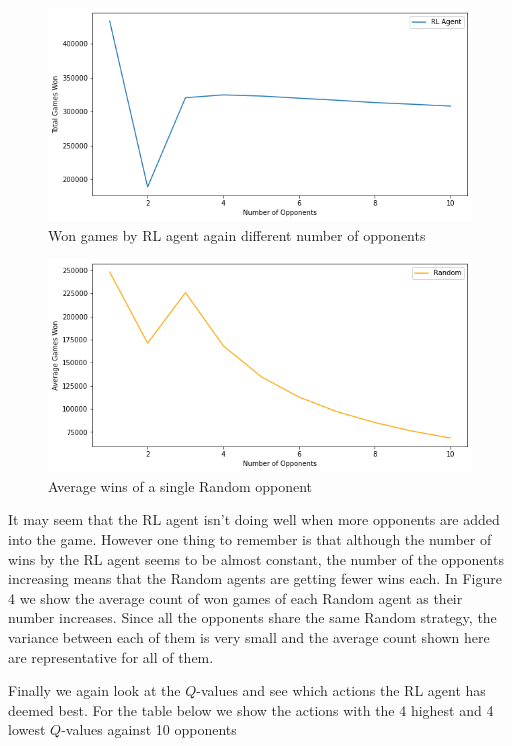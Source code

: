 \documentclass[11pt, oneside]{article}   	%
\begin{document}
\begin{figure}[h]
    \centering
    \includegraphics[scale=0.5]{./images/multi_opp_rl.png}
    \caption{Won games by RL agent again different number of opponents}
    \label{fig:mesh1}
\end{figure}

\begin{figure}[h]
    \centering
    \includegraphics[scale=0.5]{./images/multi_opp_random.png}
    \caption{Average wins of a single Random opponent}
    \label{fig:mesh1}
\end{figure}

It may seem that the RL agent isn't doing well when more opponents are added into the game. However one thing to remember is that although the number of wins by the RL agent seems to be almost constant, the number of the opponents increasing means that the Random agents are getting fewer wins each. In Figure 4 we show the average count of won games of each Random agent as their number increases. Since all the opponents share the same Random strategy, the variance between each of them is very small and the average count shown here are representative for all of them.

\hfill


Finally we again look at the $Q$-values and see which actions the RL agent has deemed best. For the table below we show the actions with the 4 highest and 4 lowest $Q$-values against 10 opponents
\end{document}
